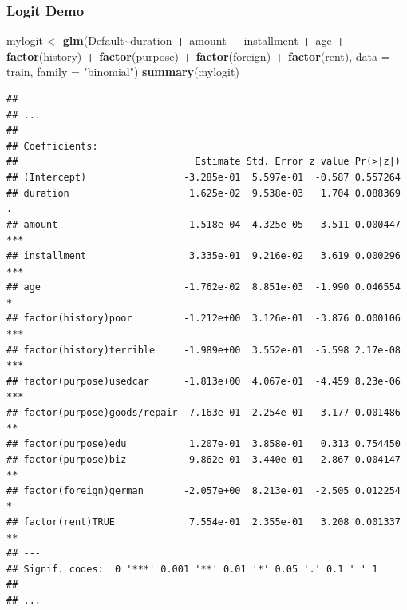\documentclass[
  shownotes,
  xcolor={svgnames},
  hyperref={colorlinks,citecolor=DarkBlue,linkcolor=DarkRed,urlcolor=DarkBlue}
  , aspectratio=169]{beamer}
\newenvironment{Shaded}{\begin{snugshade}}{\end{snugshade}}
\newcommand{\DataTypeTok}[1]{\textcolor[rgb]{0.13,0.29,0.53}{#1}}
\newcommand{\KeywordTok}[1]{\textcolor[rgb]{0.13,0.29,0.53}{\textbf{#1}}}
\newcommand{\NormalTok}[1]{#1}
\newcommand{\OperatorTok}[1]{\textcolor[rgb]{0.81,0.36,0.00}{\textbf{#1}}}
\newcommand{\StringTok}[1]{\textcolor[rgb]{0.31,0.60,0.02}{#1}}
\begin{document}
\begin{frame}[fragile]
\frametitle{Logit Demo}

\begin{scriptsize}
\begin{Shaded}
\begin{Highlighting}[]
\NormalTok{mylogit \textless{}{-}}\StringTok{ }\KeywordTok{glm}\NormalTok{(Default}\OperatorTok{\textasciitilde{}}\NormalTok{duration }\OperatorTok{+}\StringTok{ }\NormalTok{amount }\OperatorTok{+}\StringTok{ }\NormalTok{installment }\OperatorTok{+}\StringTok{ }\NormalTok{age }
              \OperatorTok{+}\StringTok{ }\KeywordTok{factor}\NormalTok{(history) }\OperatorTok{+}\StringTok{ }\KeywordTok{factor}\NormalTok{(purpose) }\OperatorTok{+}\StringTok{ }\KeywordTok{factor}\NormalTok{(foreign) }\OperatorTok{+}\StringTok{ }\KeywordTok{factor}\NormalTok{(rent), }
              \DataTypeTok{data =}\NormalTok{ train, }\DataTypeTok{family =} \StringTok{"binomial"}\NormalTok{)}
\KeywordTok{summary}\NormalTok{(mylogit)}
\end{Highlighting}
\end{Shaded}
\end{scriptsize}
\begin{tiny}
\begin{verbatim}
## 
## ...
## 
## Coefficients:
##                               Estimate Std. Error z value Pr(>|z|)    
## (Intercept)                 -3.285e-01  5.597e-01  -0.587 0.557264    
## duration                     1.625e-02  9.538e-03   1.704 0.088369 .  
## amount                       1.518e-04  4.325e-05   3.511 0.000447 ***
## installment                  3.335e-01  9.216e-02   3.619 0.000296 ***
## age                         -1.762e-02  8.851e-03  -1.990 0.046554 *  
## factor(history)poor         -1.212e+00  3.126e-01  -3.876 0.000106 ***
## factor(history)terrible     -1.989e+00  3.552e-01  -5.598 2.17e-08 ***
## factor(purpose)usedcar      -1.813e+00  4.067e-01  -4.459 8.23e-06 ***
## factor(purpose)goods/repair -7.163e-01  2.254e-01  -3.177 0.001486 ** 
## factor(purpose)edu           1.207e-01  3.858e-01   0.313 0.754450    
## factor(purpose)biz          -9.862e-01  3.440e-01  -2.867 0.004147 ** 
## factor(foreign)german       -2.057e+00  8.213e-01  -2.505 0.012254 *  
## factor(rent)TRUE             7.554e-01  2.355e-01   3.208 0.001337 ** 
## ---
## Signif. codes:  0 '***' 0.001 '**' 0.01 '*' 0.05 '.' 0.1 ' ' 1
## 
## ...
\end{verbatim}
\end{tiny}
\end{frame}
\end{document}
